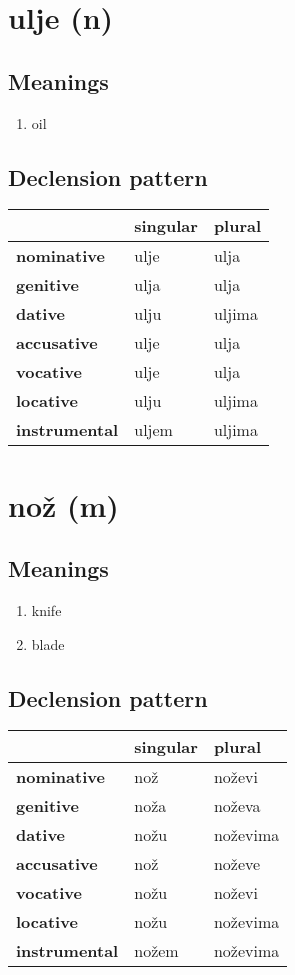 \filbreak
\section{ulje (n)}
\subsection*{Meanings}
\begin{enumerate}
\item oil
\end{enumerate}
\subsection*{Declension pattern}
\begin{tabularx}{\linewidth}{Xll}
\toprule
{} & singular &  plural \\
\midrule
\textbf{nominative  } &     ulje &    ulja \\
\textbf{genitive    } &     ulja &    ulja \\
\textbf{dative      } &     ulju &  uljima \\
\textbf{accusative  } &     ulje &    ulja \\
\textbf{vocative    } &     ulje &    ulja \\
\textbf{locative    } &     ulju &  uljima \\
\textbf{instrumental} &    uljem &  uljima \\
\bottomrule
\end{tabularx}

\filbreak
\section{nož (m)}
\subsection*{Meanings}
\begin{enumerate}
\item knife
\item blade
\end{enumerate}
\subsection*{Declension pattern}
\begin{tabularx}{\linewidth}{Xll}
\toprule
{} & singular &    plural \\
\midrule
\textbf{nominative  } &      nož &    noževi \\
\textbf{genitive    } &     noža &    noževa \\
\textbf{dative      } &     nožu &  noževima \\
\textbf{accusative  } &      nož &    noževe \\
\textbf{vocative    } &     nožu &    noževi \\
\textbf{locative    } &     nožu &  noževima \\
\textbf{instrumental} &    nožem &  noževima \\
\bottomrule
\end{tabularx}

